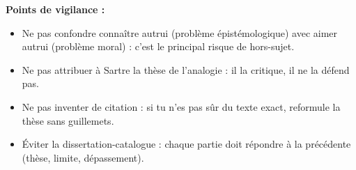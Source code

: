 \documentclass[11pt]{article}
\begin{document}
\begin{corrige}
\textbf{Points de vigilance :}
\begin{itemize}
\item Ne pas confondre \guillemotleft connaître autrui \guillemotright (problème épistémologique) avec \guillemotleft aimer autrui \guillemotright (problème moral) : c'est le principal risque de hors-sujet.
\item Ne pas attribuer à Sartre la thèse de l'analogie : il la critique, il ne la défend pas.
\item Ne pas inventer de citation : si tu n'es pas sûr du texte exact, reformule la thèse sans guillemets.
\item Éviter la dissertation-catalogue : chaque partie doit répondre à la précédente (thèse, limite, dépassement).
\end{itemize}
\end{corrige}
\end{document}
